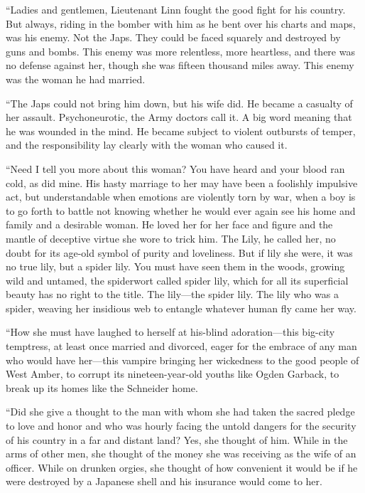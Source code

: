 \documentclass{novel}
\begin{document}
{“Ladies and gentlemen, Lieutenant Linn fought the good fight for his country. But always, riding in the bomber with him as he bent over his charts and maps, was his enemy. Not the Japs. They could be faced squarely and destroyed by guns and bombs. This enemy was more relentless, more heartless, and there was no defense against her, though she was fifteen thousand miles away. This enemy was the woman he had married.

“The Japs could not bring him down, but his wife did. He became a casualty of her assault. Psychoneurotic, the Army doctors call it. A big word meaning that he was wounded in the mind. He became subject to violent outbursts of temper, and the responsibility lay clearly with the woman who caused it.

“Need I tell you more about this woman? You have heard and your blood ran cold, as did mine. His hasty marriage to her may have been a foolishly impulsive act, but understandable when emotions are violently torn by war, when a boy is to go forth to battle not knowing whether he would ever again see his home and family and a desirable woman. He loved her for her face and figure and the mantle of deceptive virtue she wore to trick him. The Lily, he called her, no doubt for its age-old symbol of purity and loveliness. But if lily she were, it was no true lily, but a spider lily. You must have seen them in the woods, growing wild and untamed, the spiderwort called spider lily, which for all its superficial beauty has no right to the title. The lily—the spider lily. The lily who was a spider, weaving her insidious web to entangle whatever human fly came her way.

“How she must have laughed to herself at his-blind adoration—this big-city temptress, at least once married and divorced, eager for the embrace of any man who would have her—this vampire bringing her wickedness to the good people of West Amber, to corrupt its nineteen-year-old youths like Ogden Garback, to break up its homes like the Schneider home.

“Did she give a thought to the man with whom she had taken the sacred pledge to love and honor and who was hourly facing the untold dangers for the security of his country in a far and distant land? Yes, she thought of him. While in the arms of other men, she thought of the money she was receiving as the wife of an officer. While on drunken orgies, she thought of how convenient it would be if he were destroyed by a Japanese shell and his insurance would come to her.

}
\end{document}
